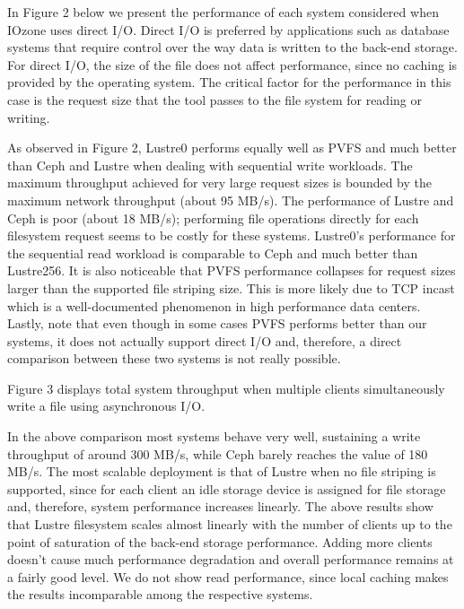 \documentclass[11pt]{article}
\begin{document}
In Figure 2 below we present the performance of each system considered when 
IOzone uses direct I/O. Direct I/O is preferred by applications such as 
database systems that require control over the way data is written to the 
back-end storage. For direct I/O, the size of the file does not affect 
performance, since no caching is provided by the operating system. The 
critical factor for the performance in this case is the request size that 
the tool passes to the file system for reading or writing.


As observed in Figure 2, Lustre0 performs equally well as PVFS and much 
better than Ceph and Lustre when dealing with sequential write workloads. 
The maximum throughput achieved for very large request sizes is bounded 
by the maximum network throughput (about 95 MB/s). The performance of 
Lustre and Ceph is poor (about 18 MB/s); performing file operations 
directly for each filesystem request seems to be costly for these systems. 
Lustre0’s performance for the sequential read workload is comparable to 
Ceph and much better than Lustre256. It is also noticeable that PVFS 
performance collapses for request sizes larger than the supported 
file striping size. This is more likely due to TCP incast which is a 
well-documented phenomenon in high performance data centers. Lastly, 
note that even though in some cases PVFS performs better than our 
systems, it does not actually support direct I/O and, therefore, a 
direct comparison between these two systems is not really possible.

Figure 3 displays total system throughput when multiple clients 
simultaneously write a file using asynchronous I/O.


In the above comparison most systems behave very well, sustaining 
a write throughput of around 300 MB/s, while Ceph barely reaches 
the value of 180 MB/s. The most scalable deployment is that of 
Lustre when no file striping is supported, since for each client 
an idle storage device is assigned for file storage and, therefore, 
system performance increases linearly. The above results show that 
Lustre filesystem scales almost linearly with the number of clients 
up to the point of saturation of the back-end storage performance. 
Adding more clients doesn't cause much performance degradation and 
overall performance remains at a fairly good level. We do not show 
read performance, since local caching makes the results incomparable 
among the respective systems.
\end{document}
